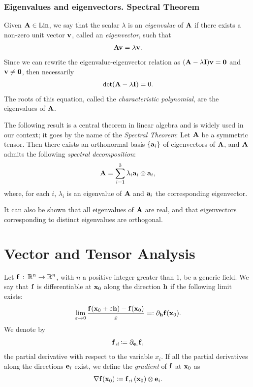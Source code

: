 \subsubsection{Eigenvalues and eigenvectors. Spectral Theorem}
Given $\mathbf{A}\in\operatorname{Lin}$, we say that the scalar $\lambda$ is an \textit{eigenvalue} of $\mathbf{A}$ if there exists a non-zero unit vector $\mathbf{v}$, called an \textit{eigenvector}, such that
\begin{equation}
	\mathbf{A} \mathbf{v} =\lambda \mathbf{v}.
\end{equation}
Since we can rewrite the eigenvalue-eigenvector relation as $(\mathbf{A} -\lambda\mathbf{I})\mathbf{v} =\mathbf{0}$ and $\mathbf{v} \neq \mathbf{0}$, then necessarily
\begin{equation}
	\det (\mathbf{A} -\lambda \mathbf{I})=0.
\end{equation}
The roots of this equation, called the \textit{characteristic polynomial}, are the eigenvalues of $\mathbf{A}$.

The following result is a central theorem in linear algebra and is widely used in our context; it goes by the name of the \textit{Spectral Theorem}:
Let $\mathbf{A}$ be a symmetric tensor. Then there exists an orthonormal basis $\{\mathbf{a}_i\}$ of eigenvectors of $\mathbf{A}$, and $\mathbf{A}$ admits the following \textit{spectral decomposition}:
\begin{equation}
	\mathbf{A}=\sum_{i=1}^3 \lambda_i \mathbf{a}_i\otimes\mathbf{a}_i,
\end{equation}
where, for each $i$, $\lambda_i$ is an eigenvalue of $\mathbf{A}$ and $\mathbf{a}_i$ the corresponding eigenvector.

It can also be shown that all eigenvalues of $\mathbf{A}$ are real, and that eigenvectors corresponding to distinct eigenvalues are orthogonal.

\section{Vector and Tensor Analysis}
Let $\mathbf{f} \, :\, \mathbb{R}^n\to \mathbb{R} ^n$, with $n$ a positive integer greater than 1, be a generic field. We say that $\mathbf{f}$ is differentiable at $\mathbf{x}_0$ along the direction $\mathbf{h}$ if the following limit exists:
\begin{equation}
	\lim_{\varepsilon\to 0} \frac{\mathbf{f} (\mathbf{x}_0+\varepsilon\mathbf{h})-\mathbf{f}(\mathbf{x}_0)}{\varepsilon}=: \partial_{\mathbf{h}} \mathbf{f} (\mathbf{x}_0).
\end{equation} 
We denote by 
\begin{equation}
	\mathbf{f},_i\coloneqq \partial_{\mathbf{e}_i}\mathbf{f},
\end{equation}
the partial derivative with respect to the variable $x_i$. If all the partial derivatives along the directions $\mathbf{e}_i$ exist, we define the \textit{gradient} of $\mathbf{f}$ at $\mathbf{x}_0$ as
\begin{equation}
	\nabla \mathbf{f} (\mathbf{x}_0)\coloneqq \mathbf{f},_i(\mathbf{x}_0)\otimes \mathbf{e}_i.
\end{equation}

